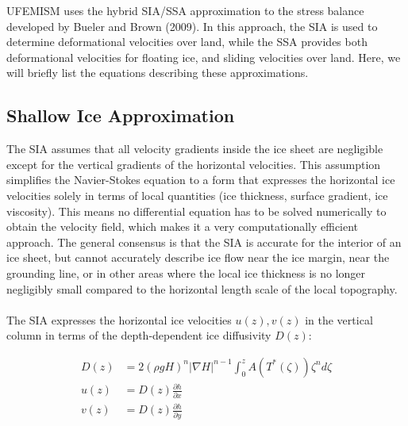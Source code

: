 \documentclass{article}
\begin{document}
UFEMISM uses the hybrid SIA/SSA approximation to the stress balance developed by Bueler and Brown (2009). In this approach, the SIA is used to determine deformational velocities over land, while the SSA provides both deformational velocities for floating ice, and sliding velocities over land. Here, we will briefly list the equations describing these approximations.

\subsection{Shallow Ice Approximation}

The SIA assumes that all velocity gradients inside the ice sheet are negligible except for the vertical gradients of the horizontal velocities. This assumption simplifies the Navier-Stokes equation to a form that expresses the horizontal ice velocities solely in terms of local quantities (ice thickness, surface gradient, ice viscosity). This means no differential equation has to be solved numerically to obtain the velocity field, which makes it a very computationally efficient approach. The general consensus is that the SIA is accurate for the interior of an ice sheet, but cannot accurately describe ice flow near the ice margin, near the grounding line, or in other areas where the local ice thickness is no longer negligibly small compared to the horizontal length scale of the local topography.\\
\\
The SIA expresses the horizontal ice velocities $u(z),v(z)$ in the vertical column in terms of the depth-dependent ice diffusivity $D(z)$:

\begin{align} \label{eq:SIA}
D(z) &= 2 {(\rho g H)}^n {\left| \nabla H \right| }^{n-1} \int_0^z A\left( T^{\ast}(\zeta)\right) \zeta^n d\zeta \\
u(z) &= D(z) \frac{\partial h}{\partial x} \\
v(z) &= D(z) \frac{\partial h}{\partial y}
\end{align}
\end{document}
